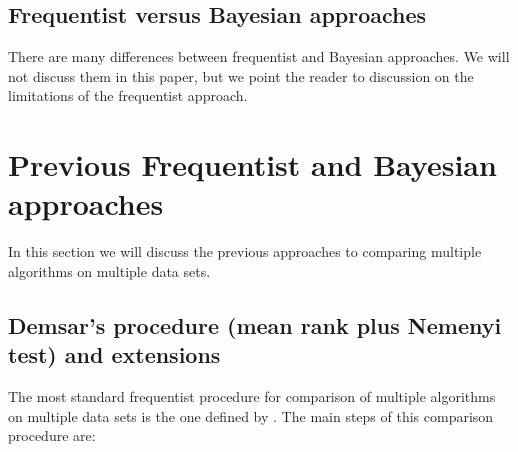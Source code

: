 \documentclass[twoside,11pt,preprint]{article}
\begin{document}
\hypertarget{frequentist-versus-bayesian-approaches}{%
\subsection{Frequentist versus Bayesian approaches}\label{frequentist-versus-bayesian-approaches}}

There are many differences between frequentist and Bayesian
approaches. We will not discuss them in this paper, but we point the
reader to \citet{benavoli2017time} discussion on the limitations of the
frequentist approach.

\hypertarget{previous-frequentist-and-bayesian-approaches}{%
\section{\texorpdfstring{Previous Frequentist and Bayesian approaches \label{sec:prev}}{Previous Frequentist and Bayesian approaches }}\label{previous-frequentist-and-bayesian-approaches}}

In this section we will discuss the previous approaches to comparing multiple algorithms on multiple data sets.

\hypertarget{demsars-procedure-mean-rank-plus-nemenyi-test-and-extensions}{%
\subsection{\texorpdfstring{Demsar's procedure (mean rank plus Nemenyi test) and extensions \label{sec:demsar}}{Demsar's procedure (mean rank plus Nemenyi test) and extensions }}\label{demsars-procedure-mean-rank-plus-nemenyi-test-and-extensions}}

The most standard frequentist procedure for comparison of multiple
algorithms on multiple data sets is the one defined by \citet{demsar}. The
main steps of this comparison procedure are:
\end{document}
